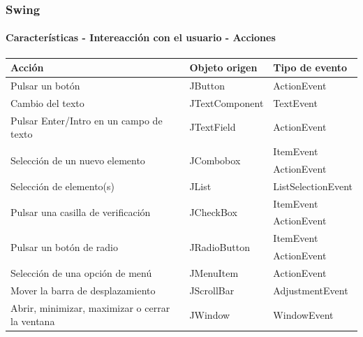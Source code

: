 \documentclass{beamer}
\begin{document}
	\begin{frame}
		\frametitle{Swing}
		\framesubtitle{Caracter\'isticas - Intereacci\'on con el usuario - Acciones}
        {\scriptsize
        \begin{tabular}{p{6cm}p{2.5cm}p{2.5cm}} \hline 
            \textbf{Acci\'on} & \textbf{Objeto origen} & \textbf{Tipo de evento} \\ \hline
            \multirow{2}{*}{Pulsar un bot\'on} & \multirow{2}{*}{JButton} & \multirow{2}{*}{ActionEvent} \\ & & \\ \hline
            \multirow{2}{*}{Cambio del texto} & \multirow{2}{*}{JTextComponent} & \multirow{2}{*}{TextEvent} \\ & & \\ \hline
            \multirow{2}{*}{Pulsar Enter/Intro en un campo de texto} & \multirow{2}{*}{JTextField} & \multirow{2}{*}{ActionEvent} \\ & & \\ \hline
            \multirow{2}{*}{Selecci\'on de un nuevo elemento} & \multirow{2}{*}{JCombobox} & ItemEvent \\
            & & ActionEvent \\ \hline
            \multirow{2}{*}{Selecci\'on de elemento(s)} & \multirow{2}{*}{JList} & \multirow{2}{*}{ListSelectionEvent} \\ & & \\ \hline
            \multirow{2}{*}{Pulsar una casilla de verificaci\'on} & \multirow{2}{*}{JCheckBox} & ItemEvent \\
            & & ActionEvent \\ \hline
            \multirow{2}{*}{Pulsar un bot\'on de radio} & \multirow{2}{*}{JRadioButton} & ItemEvent \\
            & & ActionEvent \\ \hline
            \multirow{2}{*}{Selecci\'on de una opci\'on de men\'u} & \multirow{2}{*}{JMenuItem} & \multirow{2}{*}{ActionEvent} \\ & & \\ \hline
            \multirow{2}{*}{Mover la barra de desplazamiento} & \multirow{2}{*}{JScrollBar} & \multirow{2}{*}{AdjustmentEvent} \\ & & \\ \hline
            \multirow{2}{*}{Abrir, minimizar, maximizar o cerrar la ventana} & \multirow{2}{*}{JWindow} & \multirow{2}{*}{WindowEvent} \\ & &\\ \hline
        \end{tabular}}
	\end{frame}	
\end{document}
